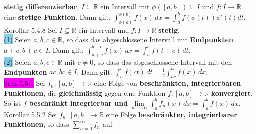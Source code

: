 \documentclass[landscape, 10pt]{article}
\newcommand{\R}{\mathbb{R}}
\begin{document}
\begin{multicols}{3}
                     \textbf{stetig differenzierbar}, 
                     \textcolor{NavyBlue}{$I\subseteq\R$}
                     ein Intervall mit 
                     \textcolor{NavyBlue}{$\phi([a,b])\subseteq I$}
                     und \textcolor{NavyBlue}{$f:I\longrightarrow\R$} eine 
                     \textbf{stetige Funktion}. Dann gilt: 
                     \textcolor{NavyBlue}{$\int_{\phi(a)}^{\phi(b)}f(x)\,dx
                     =\int_a^bf(\phi(t))\phi'(t)dt$}.\\
              \colorbox{BurntOrange}{Korollar 5.4.8} 
                     Sei \textcolor{NavyBlue}{$I\subseteq\R$}
                     ein Intervall und \textcolor{NavyBlue}{$f:I\longrightarrow\R$} 
                     \textbf{stetig}. \\
                     \colorbox{SkyBlue}{(1)} Seien \textcolor{NavyBlue}{$a,b,c\in\R$}, 
                     so dass das abgeschlossene Intervall 
                     mit \textbf{Endpunkten} \textcolor{NavyBlue}{$a+c,b+c\in I$}. 
                     Dann gilt: 
                     \textcolor{NavyBlue}{
                     $\int_{a+c}^{b+c}f(x)\,dx=\int_a^bf(t+c)\,dt$}.\\
                     \colorbox{SkyBlue}{(2)} Seien \textcolor{NavyBlue}{$a,b,c\in\R$} mit 
                     \textcolor{NavyBlue}{$c\neq0$}, so dass das abgeschlossene Intervall mit den 
                     \textbf{Endpunkten} \textcolor{NavyBlue}{$ac,bc\in I$}. 
                     Dann gilt: \textcolor{NavyBlue}{
                     $\int_a^bf(ct)\,dt=\frac{1}{c}\int_{ac}^{bc}f(x)\,dx$}.\\
              \colorbox{magenta}{Satz 5.5.1} 
                     Sei \textcolor{NavyBlue}{$f_n:[a,b]\longrightarrow\R$} 
                     eine Folge von \textbf{beschränkten, integrierbaren Funktionen}, 
                     die \textbf{gleichmässig} gegen 
                     eine Funktion 
                     \textcolor{NavyBlue}{$f:[a,b]\longrightarrow\R$} 
                     \textbf{konvergiert}.
                     So ist \textcolor{NavyBlue}{$f$} 
                     \textbf{beschränkt integrierbar und} 
                     \textcolor{NavyBlue}{
                     $\lim\limits_{n\to\infty}\int_a^bf_n(x)\,dx =\int_a^bf(x)\,dx$}.\\
              \colorbox{BurntOrange}{Korollar 5.5.2} Sei 
                     \textcolor{NavyBlue}{$f_n:[a,b]\longrightarrow\R$} eine Folge 
                     \textbf{beschränkter, integrierbarer Funktionen}, so dass 
                     \textcolor{NavyBlue}{$\sum_{n=0}^\infty f_n$} auf 

\end{multicols}
\end{document}

